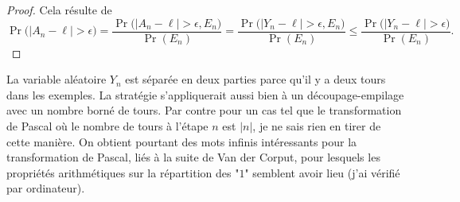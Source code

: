 \documentclass[12pt,a4paper]{article}
\begin{document}
\begin{proof}
Cela résulte de
$$
\Pr\bigl(|A_n - \ell|> \epsilon\bigr) = 
\frac{\Pr\bigl(|A_n - \ell|> \epsilon, E_n\bigr)}{\Pr(E_n)} 
= \frac{\Pr\bigl(|Y_n - \ell|> \epsilon, E_n\bigr)}{\Pr(E_n)} 
\leq \frac{\Pr\bigl(|Y_n - \ell|> \epsilon)}{\Pr(E_n)}.  
$$
\end{proof}

La variable aléatoire $Y_n$ est séparée en deux parties parce qu'il y 
a deux tours dans les exemples. 
La stratégie s'appliquerait aussi bien à un découpage-empilage avec un 
nombre borné de tours. 
Par contre pour un cas tel que le transformation de Pascal où le nombre de 
tours à l'étape $n$ est $|n|$, je ne sais rien en tirer de cette manière. 
On obtient pourtant des mots infinis intéressants pour la transformation de 
Pascal, liés à la suite de Van der Corput, pour lesquels les propriétés arithmétiques 
sur la répartition des "$1$" semblent avoir lieu (j'ai vérifié par ordinateur). 
\end{document}
